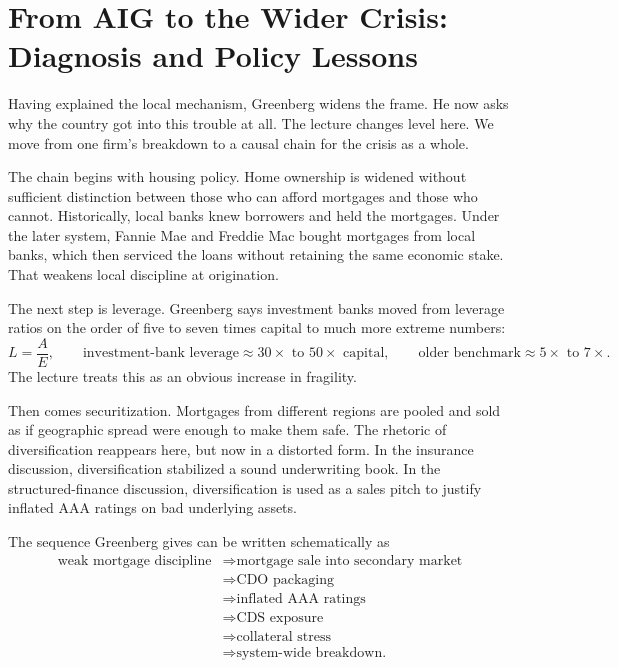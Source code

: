 \section{From AIG to the Wider Crisis: Diagnosis and Policy Lessons}

Having explained the local mechanism, Greenberg widens the frame. He now asks why the country got into this trouble at all. The lecture changes level here. We move from one firm's breakdown to a causal chain for the crisis as a whole.

The chain begins with housing policy. Home ownership is widened without sufficient distinction between those who can afford mortgages and those who cannot. Historically, local banks knew borrowers and held the mortgages. Under the later system, Fannie Mae and Freddie Mac bought mortgages from local banks, which then serviced the loans without retaining the same economic stake. That weakens local discipline at origination.

The next step is leverage. Greenberg says investment banks moved from leverage ratios on the order of five to seven times capital to much more extreme numbers:
\begin{equation}
L = \frac{A}{E},
\qquad
\text{investment-bank leverage} \approx 30\times \text{ to } 50\times \text{ capital},
\qquad
\text{older benchmark} \approx 5\times \text{ to } 7\times.
\end{equation}
The lecture treats this as an obvious increase in fragility.

Then comes securitization. Mortgages from different regions are pooled and sold as if geographic spread were enough to make them safe. The rhetoric of diversification reappears here, but now in a distorted form. In the insurance discussion, diversification stabilized a sound underwriting book. In the structured-finance discussion, diversification is used as a sales pitch to justify inflated AAA ratings on bad underlying assets.

The sequence Greenberg gives can be written schematically as
\begin{align}
\text{weak mortgage discipline}
&\Rightarrow \text{mortgage sale into secondary market} \\
&\Rightarrow \text{CDO packaging} \\
&\Rightarrow \text{inflated AAA ratings} \\
&\Rightarrow \text{CDS exposure} \\
&\Rightarrow \text{collateral stress} \\
&\Rightarrow \text{system-wide breakdown.}
\end{align}


